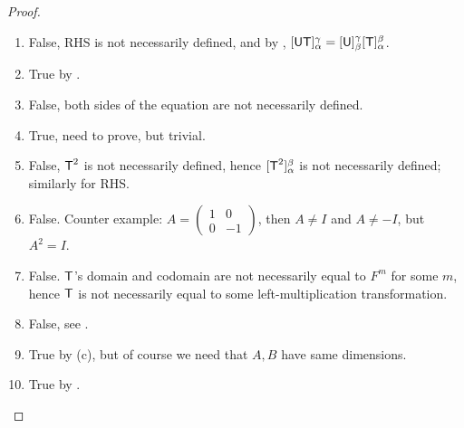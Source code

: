 \begin{proof} \ 
\begin{enumerate}
\item False, RHS is not necessarily defined, and by , \([\textsf{U}\textsf{T}]_{\alpha}^{\gamma} = [\textsf{U}]_{\beta}^{\gamma}[\textsf{T}]_{\alpha}^{\beta}\).
\item True by \THM{2.14}.
\item False, both sides of the equation are not necessarily defined.
\item True, need to prove, but trivial.
\item False, \(\textsf{T}^2\) is not necessarily defined, hence \([\textsf{T}^2]_{\alpha}^{\beta}\) is not necessarily defined;
    similarly for RHS.
\item False.
    Counter example: \(A = \begin{pmatrix} 1 & 0 \\ 0 & -1 \end{pmatrix}\), then \(A \ne I\) and \(A \ne -I\), but \(A^2 = I\).
\item False. \(\textsf{T}\)'s domain and codomain are not necessarily equal to \(F^m\) for some \(m\), hence \(\textsf{T}\) is not necessarily equal to some left-multiplication transformation.
\item False, see \RMK{2.3.3}.
\item True by (c), but of course we need that \(A, B\) have same dimensions.
\item True by \DEF{2.7}.
\end{enumerate}
\end{proof}

